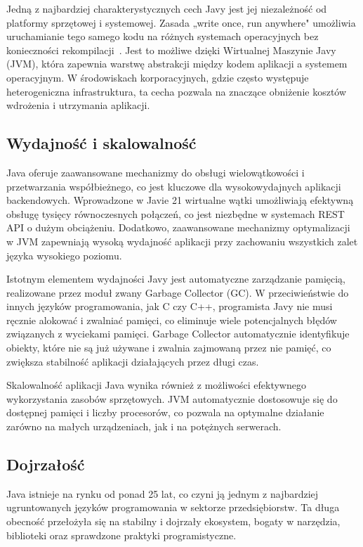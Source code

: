 \documentclass[a4paper,12pt,openany]{book}
\begin{document}
Jedną z najbardziej charakterystycznych cech Javy jest jej niezależność od platformy sprzętowej i systemowej. Zasada „write once, run anywhere" umożliwia uruchamianie tego samego kodu na różnych systemach operacyjnych bez konieczności rekompilacji~\cite{bib:guvi2023}. Jest to możliwe dzięki Wirtualnej Maszynie Javy (JVM), która zapewnia warstwę abstrakcji między kodem aplikacji a systemem operacyjnym. W środowiskach korporacyjnych, gdzie często występuje heterogeniczna infrastruktura, ta cecha pozwala na znaczące obniżenie kosztów wdrożenia i utrzymania aplikacji.

\subsection*{Wydajność i skalowalność}

Java oferuje zaawansowane mechanizmy do obsługi wielowątkowości i przetwarzania współbieżnego, co jest kluczowe dla wysokowydajnych aplikacji backendowych. Wprowadzone w Javie 21 wirtualne wątki umożliwiają efektywną obsługę tysięcy równoczesnych połączeń, co jest niezbędne w systemach REST API o dużym obciążeniu. Dodatkowo, zaawansowane mechanizmy optymalizacji w JVM zapewniają wysoką wydajność aplikacji przy zachowaniu wszystkich zalet języka wysokiego poziomu.

Istotnym elementem wydajności Javy jest automatyczne zarządzanie pamięcią, realizowane przez moduł zwany Garbage Collector (GC). W przeciwieństwie do innych języków programowania, jak C czy C++, programista Javy nie musi ręcznie alokować i zwalniać pamięci, co eliminuje wiele potencjalnych błędów związanych z wyciekami pamięci. Garbage Collector automatycznie identyfikuje obiekty, które nie są już używane i zwalnia zajmowaną przez nie pamięć, co zwiększa stabilność aplikacji działających przez długi czas.

Skalowalność aplikacji Java wynika również z możliwości efektywnego wykorzystania zasobów sprzętowych. JVM automatycznie dostosowuje się do dostępnej pamięci i liczby procesorów, co pozwala na optymalne działanie zarówno na małych urządzeniach, jak i na potężnych serwerach.

\subsection*{Dojrzałość}

Java istnieje na rynku od ponad 25 lat, co czyni ją jednym z najbardziej ugruntowanych języków programowania w sektorze przedsiębiorstw. Ta długa obecność przełożyła się na stabilny i dojrzały ekosystem, bogaty w narzędzia, biblioteki oraz sprawdzone praktyki programistyczne.
\end{document}
